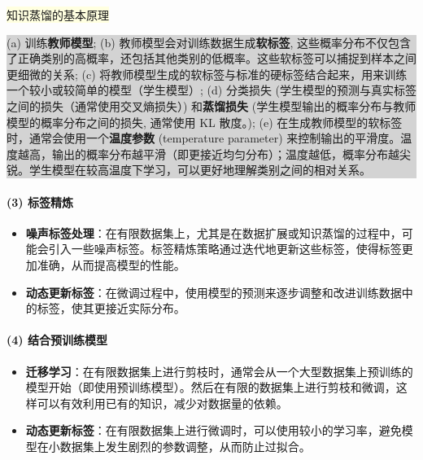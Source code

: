 \documentclass[twocolumn, 10pt]{article} %
\begin{document}
\noindent
\colorbox{lightyellow}{
知识蒸馏的基本原理
}

\noindent
\colorbox{lightgray}{
\begin{minipage}{\dimexpr\columnwidth-2\fboxsep\relax}%
        \raggedright %

(a) 训练\textbf{教师模型}; (b) 教师模型会对训练数据生成\textbf{软标签}, 这些概率分布不仅包含了正确类别的高概率，还包括其他类别的低概率。这些软标签可以捕捉到样本之间更细微的关系; (c) 将教师模型生成的软标签与标准的硬标签结合起来，用来训练一个较小或较简单的模型（学生模型）; (d) 分类损失 (学生模型的预测与真实标签之间的损失（通常使用交叉熵损失）) 和\textbf{蒸馏损失} (学生模型输出的概率分布与教师模型的概率分布之间的损失, 通常使用 KL 散度。); (e) 在生成教师模型的软标签时，通常会使用一个\textbf{温度参数} (temperature parameter) 来控制输出的平滑度。温度越高，输出的概率分布越平滑（即更接近均匀分布）；温度越低，概率分布越尖锐。学生模型在较高温度下学习，可以更好地理解类别之间的相对关系。
\end{minipage}
}


\paragraph{(3) 标签精炼} 
\begin{itemize}[left=2em] %
    \item \textbf{噪声标签处理}：在有限数据集上，尤其是在数据扩展或知识蒸馏的过程中，可能会引入一些噪声标签。标签精炼策略通过迭代地更新这些标签，使得标签更加准确，从而提高模型的性能。
    \item \textbf{动态更新标签}：在微调过程中，使用模型的预测来逐步调整和改进训练数据中的标签，使其更接近实际分布。
\end{itemize}

 \paragraph{(4) 结合预训练模型} 
\begin{itemize}[left=2em] %
    \item \textbf{迁移学习}：在有限数据集上进行剪枝时，通常会从一个大型数据集上预训练的模型开始（即使用预训练模型）。然后在有限的数据集上进行剪枝和微调，这样可以有效利用已有的知识，减少对数据量的依赖。
    \item \textbf{动态更新标签}：在有限数据集上进行微调时，可以使用较小的学习率，避免模型在小数据集上发生剧烈的参数调整，从而防止过拟合。
\end{itemize}
\end{document}
